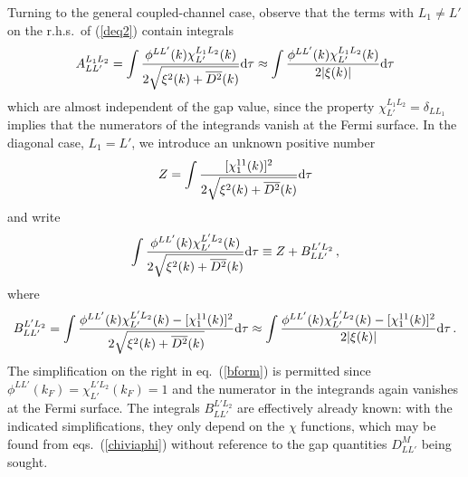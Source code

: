 Turning to the general coupled-channel case, observe that the
terms with $L_1 \neq L'$ on the r.h.s.\ of (\ref{deq2}) contain
integrals
\begin{equation}
A_{LL'}^{L_1L_2}=\int \frac {\phi^{LL'}(k)\chi^{L_1L_2}_{L'}(k)}
{2\sqrt{\xi^2(k) + {\overline{D^2}}(k)}} {\rm d} \tau
\approx \int \frac{\phi^{LL'}(k)\chi_{L'}^{L_1L_2}(k)}{2|\xi(k)|}
{\rm d} \tau
\end{equation}
which are almost independent of the gap value, since the property
$\chi_{L'}^{L_1L_2}=\delta_{LL_1}$ implies that the numerators of
the integrands vanish at the Fermi surface. In the diagonal case,
$L_1=L'$, we introduce an unknown positive number
\begin{equation}
Z = \int \frac{[\chi^{11}_1(k)]^2}
{2\sqrt{\xi^2(k) + {\overline{D^2}}(k)}} {\rm d} \tau \label{zdef}
\end{equation}
and write
\begin{equation}
\int \frac{\phi^{LL'}(k)\chi^{L'L_2}_{L'}(k)}{2\sqrt{\xi^2(k)
+ {\overline{D^2}}(k)}} {\rm d} \tau \equiv
Z + B^{L'L_2}_{LL'} \, ,  \label{bdef}
\end{equation}
where
\begin{equation}
B^{L'L_2}_{LL'}=
\int \frac {\phi^{LL'}(k)\chi^{L'L_2}_{L'}(k) -[\chi^{11}_1(k)]^2 }
{2\sqrt{\xi^2(k) + {\overline{D^2}}(k)}} {\rm d} \tau \approx
\int \frac
{\phi^{LL'}(k)\chi^{L'L_2}_{L'}(k) -[\chi^{11}_1(k)]^2 }
{2|\xi(k)|} {\rm d} \tau \, .
\label{bform}
\end{equation}
The simplification on the right in eq.~(\ref{bform}) is permitted
since $\phi^{LL'}(k_F)= \chi^{L'L_2}_{L'}(k_F)=1$ and the
numerator in the integrands again vanishes at the Fermi surface.
The integrals $B^{L'L_2}_{LL'}$ are effectively already known:
with the indicated simplifications, they only depend on the
$\chi$ functions, which may be found from eqs.~(\ref{chiviaphi})
without reference to the gap quantities $D_{LL'}^M$ being sought.

